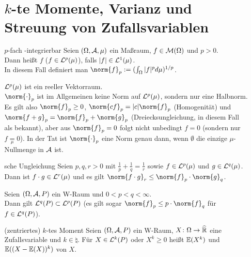 \pagebreak

\section{%
    \texorpdfstring{$k$}{k}-te Momente, Varianz und Streuung von Zufallsvariablen%
}

\begin{Def}{$p$-fach -integrierbar}
    Seien $(\Omega, \mathcal{A}, \mu)$ ein Maßraum, $f \in \mathcal{M}(\Omega)$ und $p > 0$.\\
    Dann heißt $f$  ($f \in \mathcal{L}^p(\mu)$),
    falls $|f| \in \mathcal{L}^1(\mu)$.\\
    In diesem Fall definiert man $\norm{f}_p := (\int_\Omega |f|^p d\mu)^{1/p}$.
\end{Def}

\begin{Bem}
    $\mathcal{L}^p(\mu)$ ist ein reeller Vektorraum.\\
    $\norm{\cdot}_p$ ist im Allgemeinen keine Norm auf $\mathcal{L}^p(\mu)$, sondern nur eine Halbnorm.
    Es gilt also $\norm{f}_p \ge 0$, $\norm{c f}_p = |c| \norm{f}_p$ (Homogenität) und
    $\norm{f + g}_p = \norm{f}_p + \norm{g}_p$ (Dreiecksungleichung, in diesem Fall als
     bekannt), aber aus
    $\norm{f}_p = 0$ folgt nicht unbedingt $f = 0$
    (sondern nur $f \underset{\mu}{=} 0$).
    In der Tat ist $\norm{\cdot}_p$ eine Norm genau dann, wenn $\emptyset$ die einzige
    $\mu$-Nullmenge in $\mathcal{A}$ ist.
\end{Bem}

\begin{Satz}{sche Ungleichung}
    Seien $p, q, r > 0$ mit $\frac{1}{p} + \frac{1}{q} = \frac{1}{r}$
    sowie $f \in \mathcal{L}^p(\mu)$ und $g \in \mathcal{L}^q(\mu)$.
    Dann ist $f \cdot g \in \mathcal{L}^r(\mu)$ und es gilt
    $\norm{f \cdot g}_r \le \norm{f}_p \cdot \norm{g}_q$.
\end{Satz}

\begin{Kor}
    Seien $(\Omega, \mathcal{A}, P)$ ein W-Raum und $0 < p < q < \infty$.\\
    Dann gilt $\mathcal{L}^q(P) \subset \mathcal{L}^p(P)$
    (es gilt sogar $\norm{f}_p \le p \cdot \norm{f}_q$ für $f \in \mathcal{L}^q(P)$).
\end{Kor}

\linie

\begin{Def}{(zentriertes) $k$-tes Moment}
    Seien $(\Omega, \mathcal{A}, P)$ ein W-Raum, $X\colon \Omega \rightarrow \widehat{\mathbb{R}}$ eine Zufallsvariable
    und $k \in \natural$.
    Für $X \in \mathcal{L}^k(P)$ oder $X^k \ge 0$ heißt
    $\mathbb{E}(X^k)$  und
    $\mathbb{E}((X - \mathbb{E}(X))^k)$  von $X$.
\end{Def}

